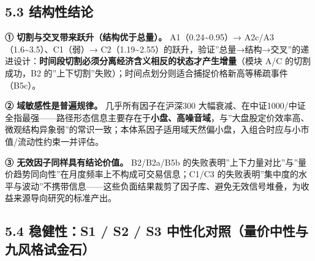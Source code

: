 \documentclass[UTF8,a4paper,zihao=-4,fontset=windows]{ctexart}
\begin{document}
\subsection{5.3 结构性结论}\label{ux7ed3ux6784ux6027ux7ed3ux8bba}

\textbf{① 切割与交叉带来跃升（结构优于总量）。}
A1（0.24\textasciitilde0.95）→
A2c/A3（1.6\textasciitilde3.5）、C1（弱）→
C2（1.19\textasciitilde2.55）的跃升，验证''总量→结构→交叉''的递进设计：\textbf{时间段切割必须分离经济含义相反的状态才产生增量}（模块
A/C 的切割成功，B2 的''上下切割''失败）；时间点划分则适合捕捉价格新高等稀疏事件（B5c）。

\textbf{② 域敏感性是普遍规律。} 几乎所有因子在沪深300
大幅衰减、在中证1000/中证全指最强------路径形态信息主要存在于\textbf{小盘、高噪音域}，与''大盘股定价效率高、微观结构异象弱''的常识一致；本体系因子适用域天然偏小盘，入组合时应与小市值/流动性约束一并评估。

\textbf{③ 无效因子同样具有结论价值。} B2/B2a/B5b
的失败表明''上下力量对比''与''量价趋势同向性''在月度频率上不构成可交易信息；C1/C3
的失败表明''集中度的水平与波动''不携带信息------这些负面结果裁剪了因子库、避免无效信号堆叠，为收益来源导向研究的标准产出。

\subsection{5.4 稳健性：S1 / S2 / S3
中性化对照（量价中性与九风格试金石）}\label{ux7a33ux5065ux6027s1-s2-s3-ux4e2dux6027ux5316ux5bf9ux7167ux91cfux4ef7ux4e2dux6027ux4e0eux4e5dux98ceux683cux8bd5ux91d1ux77f3}
\end{document}
